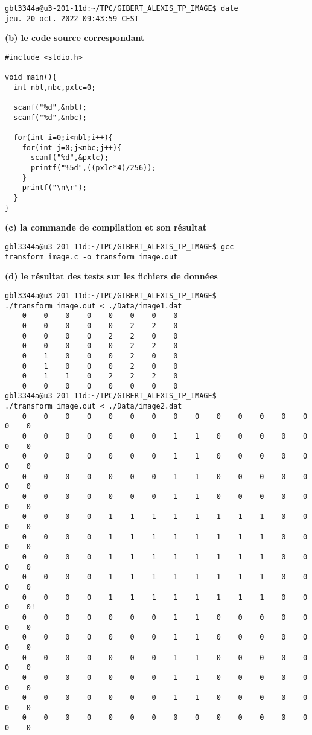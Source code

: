 \documentclass[11pt]{article}
\begin{document}
\begin{verbatim}
gbl3344a@u3-201-11d:~/TPC/GIBERT_ALEXIS_TP_IMAGE$ date
jeu. 20 oct. 2022 09:43:59 CEST
\end{verbatim}

\textbf{(b) le code source correspondant}

\begin{verbatim}
#include <stdio.h>

void main(){
  int nbl,nbc,pxlc=0;

  scanf("%d",&nbl);
  scanf("%d",&nbc);

  for(int i=0;i<nbl;i++){
    for(int j=0;j<nbc;j++){
      scanf("%d",&pxlc);
      printf("%5d",((pxlc*4)/256));
    }
    printf("\n\r");
  }
}
\end{verbatim}

\textbf{(c) la commande de compilation et son résultat}

\begin{verbatim}
gbl3344a@u3-201-11d:~/TPC/GIBERT_ALEXIS_TP_IMAGE$ gcc transform_image.c -o transform_image.out
\end{verbatim}

\textbf{(d) le résultat des tests sur les fichiers de données}

\begin{verbatim}
gbl3344a@u3-201-11d:~/TPC/GIBERT_ALEXIS_TP_IMAGE$ ./transform_image.out < ./Data/image1.dat   
    0    0    0    0    0    0    0    0
    0    0    0    0    0    2    2    0
    0    0    0    0    2    2    0    0
    0    0    0    0    0    2    2    0
    0    1    0    0    0    2    0    0
    0    1    0    0    0    2    0    0
    0    1    1    0    2    2    2    0
    0    0    0    0    0    0    0    0
gbl3344a@u3-201-11d:~/TPC/GIBERT_ALEXIS_TP_IMAGE$ ./transform_image.out < ./Data/image2.dat
    0    0    0    0    0    0    0    0    0    0    0    0    0    0    0    0
    0    0    0    0    0    0    0    1    1    0    0    0    0    0    0    0
    0    0    0    0    0    0    0    1    1    0    0    0    0    0    0    0
    0    0    0    0    0    0    0    1    1    0    0    0    0    0    0    0
    0    0    0    0    0    0    0    1    1    0    0    0    0    0    0    0
    0    0    0    0    1    1    1    1    1    1    1    1    0    0    0    0
    0    0    0    0    1    1    1    1    1    1    1    1    0    0    0    0
    0    0    0    0    1    1    1    1    1    1    1    1    0    0    0    0
    0    0    0    0    1    1    1    1    1    1    1    1    0    0    0    0
    0    0    0    0    1    1    1    1    1    1    1    1    0    0    0    0!
    0    0    0    0    0    0    0    1    1    0    0    0    0    0    0    0
    0    0    0    0    0    0    0    1    1    0    0    0    0    0    0    0
    0    0    0    0    0    0    0    1    1    0    0    0    0    0    0    0
    0    0    0    0    0    0    0    1    1    0    0    0    0    0    0    0
    0    0    0    0    0    0    0    1    1    0    0    0    0    0    0    0
    0    0    0    0    0    0    0    0    0    0    0    0    0    0    0    0
\end{verbatim}
\end{document}
